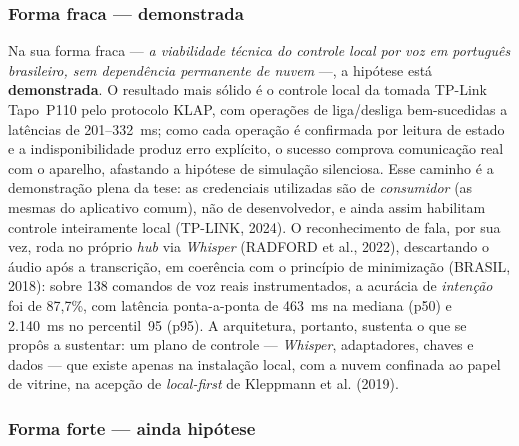 \subsubsection{Forma fraca --- demonstrada}

Na sua forma fraca --- \emph{a viabilidade técnica do controle local por voz em
português brasileiro, sem dependência permanente de nuvem} ---, a hipótese está
\textbf{demonstrada}. O resultado mais sólido é o controle local da tomada TP-Link
Tapo~P110 pelo protocolo KLAP, com operações de liga/desliga bem-sucedidas a latências
de 201--332~ms; como cada operação é confirmada por leitura de estado e a
indisponibilidade produz erro explícito, o sucesso comprova comunicação real com o
aparelho, afastando a hipótese de simulação silenciosa. Esse caminho é a demonstração
plena da tese: as credenciais utilizadas são de \emph{consumidor} (as mesmas do
aplicativo comum), não de desenvolvedor, e ainda assim habilitam controle inteiramente
local (TP-LINK, 2024). O reconhecimento de fala, por sua vez, roda no próprio
\textit{hub} via \textit{Whisper} (RADFORD et al., 2022), descartando o áudio após a
transcrição, em coerência com o princípio de minimização (BRASIL, 2018): sobre 138
comandos de voz reais instrumentados, a acurácia de \emph{intenção} foi de 87,7\%, com
latência ponta-a-ponta de 463~ms na mediana (p50) e 2.140~ms no percentil~95 (p95). A
arquitetura, portanto, sustenta o que se propôs a sustentar: um plano de controle ---
\textit{Whisper}, adaptadores, chaves e dados --- que existe apenas na instalação local,
com a nuvem confinada ao papel de vitrine, na acepção de \textit{local-first} de
Kleppmann et al. (2019).

\subsubsection{Forma forte --- ainda hipótese}

